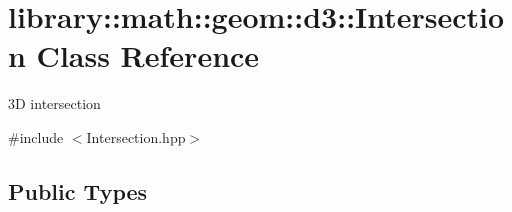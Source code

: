 \hypertarget{classlibrary_1_1math_1_1geom_1_1d3_1_1_intersection}{}\section{library\+:\+:math\+:\+:geom\+:\+:d3\+:\+:Intersection Class Reference}
\label{classlibrary_1_1math_1_1geom_1_1d3_1_1_intersection}


3D intersection  




{\ttfamily \#include $<$Intersection.\+hpp$>$}

\subsection*{Public Types}
